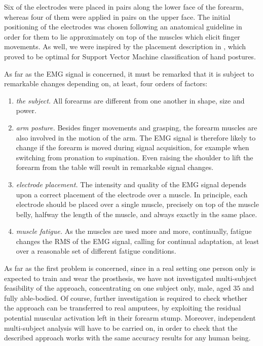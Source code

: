 Six of the electrodes were placed in pairs along the lower face
of the forearm, whereas four of them were applied in pairs on the
upper face. The initial positioning of the electrodes was chosen
following an anatomical guideline \cite{...} in order for them to lie
approximately on top of the muscles which elicit finger movements. As
well, we were inspired by the placement description in \cite{smagt},
which proved to be optimal for Support Vector Machine classification
of hand postures.

As far as the EMG signal is concerned, it must be remarked that it is
subject to remarkable changes depending on, at least, four orders of
factors:

\begin{enumerate}

  \item \emph{the subject.} All forearms are different from one
    another in shape, size and power.

  \item \emph{arm posture.} Besides finger movements and grasping, the
    forearm muscles are also involved in the motion of the arm. The
    EMG signal is therefore likely to change if the forearm is moved
    during signal acquisition, for example when switching from
    pronation to supination. Even raising the shoulder to lift the
    forearm from the table will result in remarkable signal changes.

  \item \emph{electrode placement.} The intensity and quality of the
    EMG signal depends upon a correct placement of the electrode over
    a muscle. In principle, each electrode should be placed over a
    single muscle, precisely on top of the muscle belly, halfway the
    length of the muscle, and always exactly in the same place.

  \item \emph{muscle fatigue.} As the muscles are used more and more,
    continually, fatigue changes the RMS of the EMG signal, calling
    for continual adaptation, at least over a reasonable set of
    different fatigue conditions.

\end{enumerate}

As far as the first problem is concerned, since in a real setting one
person only is expected to train and wear the prosthesis, we have not
investigated multi-subject feasibility of the approach, concentrating
on one subject only, male, aged $35$ and fully able-bodied. Of course,
further investigation is required to check whether the approach can be
transferred to real amputees, by exploiting the residual potential
muscular activation left in their forearm stump. Moreover, independent
multi-subject analysis will have to be carried on, in order to check
that the described approach works with the same accuracy results for
any human being.

